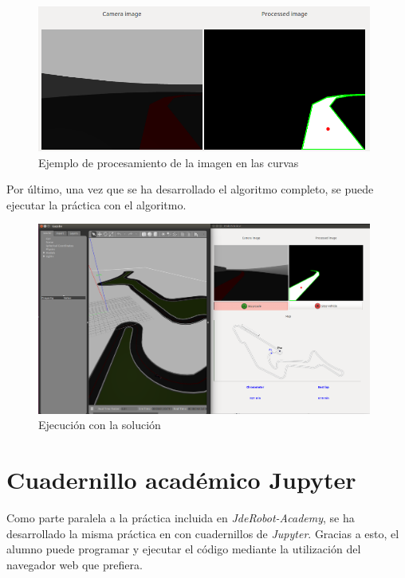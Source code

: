 \begin{figure}[H]
  \begin{center}
    \includegraphics[width=0.98\textwidth]{figures/filtrado_curvas_chrono.png}
		\caption{Ejemplo de procesamiento de la imagen en las curvas}
		\label{fig.pdiecch}
		\end{center}
\end{figure}

Por último, una vez que se ha desarrollado el algoritmo completo, se puede ejecutar la práctica con el algoritmo.

\begin{figure}[H]
  \begin{center}
    \includegraphics[width=0.98\textwidth]{figures/ejec_algoritmo_ch.png}
		\caption{Ejecución con la solución}
		\label{fig.ealgch}
		\end{center}
\end{figure}

\section{Cuadernillo académico Jupyter}
Como parte paralela a la práctica incluida en \textit{JdeRobot-Academy}, se ha desarrollado la misma práctica en con cuadernillos de \textit{Jupyter}. Gracias a esto, el alumno puede programar y ejecutar el código mediante la utilización del navegador web que prefiera.

